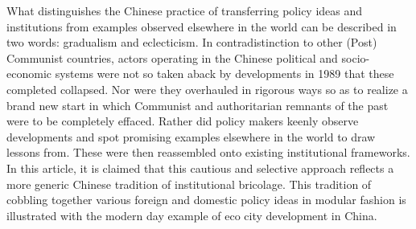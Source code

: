 What distinguishes the Chinese practice of transferring policy ideas and institutions from examples observed elsewhere in the world can be described in two words: gradualism and eclecticism. In contradistinction to other (Post) Communist countries, actors operating in the Chinese political and socio-economic systems were not so taken aback by developments in 1989 that these completed collapsed. Nor were they overhauled in rigorous ways so as to realize a brand new start in which Communist and authoritarian remnants of the past were to be completely effaced. Rather did policy makers keenly observe developments and spot promising examples elsewhere in the world to draw lessons from. These were then reassembled onto existing institutional frameworks. In this article, it is claimed that this cautious and selective approach reflects a more generic Chinese tradition of institutional bricolage. This tradition of cobbling together various foreign and domestic policy ideas in modular fashion is illustrated with the modern day example of eco city development in China.
